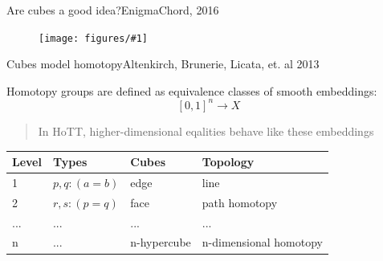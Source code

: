 \documentclass[english]{beamer}
\newcommand{\fig}[2]{
    \begin{figure}\begin{center}\texttt{[image: figures/\#1]}\caption{#2\label{#1}}\end{center}
    \end{figure}}
\begin{document}
\begin{frame}{Are cubes a good idea?}{EnigmaChord, 2016}

\fig{cube-joke.jpg}{}

\pause

\end{frame}


\begin{frame}{Cubes model homotopy}{Altenkirch, Brunerie, Licata, et. al 2013}
 
Homotopy groups are defined as equivalence classes of smooth embeddings:
$$[0,1]^n \rightarrow X$$

\begin{quotation}
In HoTT, higher-dimensional eqalities behave like these embeddings
\end{quotation}
\pause

    \begin{table}[]
        \begin{tabular}{@{}llll@{}}
        \toprule
        Level                & Types                & Cubes                 & Topology               \\ \midrule
        1                    & $p,q : (a = b)$        & edge                  & line                   \\
        2                    & $r,s : (p = q)$        & face                  & path homotopy          \\
        ... & ... & ... & ...   \\
        n                    & ... & n-hypercube           & n-dimensional homotopy \\ \bottomrule
        \end{tabular}
    \end{table}

%  
\end{frame}
\end{document}
